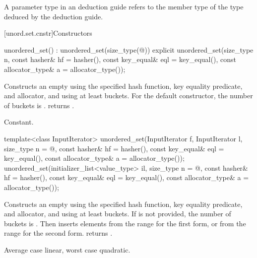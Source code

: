 \pnum
A  parameter type in an  deduction guide
refers to the  member type of
the type deduced by the deduction guide.

[unord.set.cnstr]{Constructors}

%
\begin{itemdecl}
unordered_set() : unordered_set(size_type(@\seebelow@)) { }
explicit unordered_set(size_type n,
                       const hasher& hf = hasher(),
                       const key_equal& eql = key_equal(),
                       const allocator_type& a = allocator_type());
\end{itemdecl}

\begin{itemdescr}
\pnum
\effects
Constructs an empty  using the
specified hash function, key equality predicate, and allocator, and
using at least  buckets.  For the default constructor,
the number of buckets is .
 returns .

\pnum
\complexity
Constant.
\end{itemdescr}

%
\begin{itemdecl}
template<class InputIterator>
  unordered_set(InputIterator f, InputIterator l,
                size_type n = @\seebelow@,
                const hasher& hf = hasher(),
                const key_equal& eql = key_equal(),
                const allocator_type& a = allocator_type());
unordered_set(initializer_list<value_type> il,
              size_type n = @\seebelow@,
              const hasher& hf = hasher(),
              const key_equal& eql = key_equal(),
              const allocator_type& a = allocator_type());
\end{itemdecl}

\begin{itemdescr}
\pnum
\effects
Constructs an empty  using the
specified hash function, key equality predicate, and allocator, and
using at least  buckets. If  is not
provided, the number of buckets is . Then
inserts elements from the range 
for the first form, or from the range
 for the second form.
 returns .

\pnum
\complexity
Average case linear, worst case quadratic.
\end{itemdescr}

